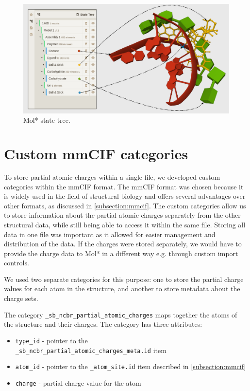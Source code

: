 \documentclass[
  digital,     %
  oneside,     %
  nosansbold,  %
  nocolorbold, %
  lof,         %
  lot,         %
]{fithesis4}
\begin{document}
\begin{figure}
  \begin{center}
    \includegraphics[width=\textwidth]{figures/state_tree.png}
  \end{center}
  \caption{Mol* state tree.}
  \label{fig:state_tree}
\end{figure}

\section{Custom mmCIF categories}
\label{section:custom_mmcif_categories}

To store partial atomic charges within a single file, we developed custom categories within the mmCIF format. The mmCIF format was chosen because it is widely used in the field of structural biology and offers several advantages over other formats, as discussed in \ref{subsection:mmcif}. The custom categories allow us to store information about the partial atomic charges separately from the other structural data, while still being able to access it within the same file. Storing all data in one file was important as it allowed for easier management and distribution of the data. If the charges were stored separately, we would have to provide the charge data to Mol* in a different way e.g. through custom import controls.


We used two separate categories for this purpose: one to store the partial charge values for each atom in the structure, and another to store metadata about the charge sets.

The category \texttt{\_sb\_ncbr\_partial\_atomic\_charges} maps together the atoms of the structure and their charges. The category has three attributes:

\begin{itemize}
  \item \texttt{type\_id} - pointer to the \\ \texttt{\_sb\_ncbr\_partial\_atomic\_charges\_meta.id} item
  \item \texttt{atom\_id} - pointer to the \texttt{\_atom\_site.id} item described in \ref{subsection:mmcif}
  \item \texttt{charge} - partial charge value for the atom
\end{itemize}
\end{document}
